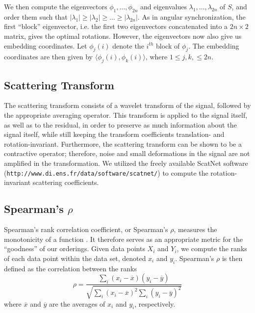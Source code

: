 \documentclass[10pt]{article}
\begin{document}
We then compute the eigenvectors $\phi_1, \dots, \phi_{2n}$ and eigenvalues $\lambda_1, \dots, \lambda_{2n}$ of $S$, and order them such that $|\lambda_1| \ge |\lambda_2| \ge \dots \ge |\lambda_{2n}|$.
%
As in angular synchronization, the first ``block'' eigenvector, i.e. the first two eigenvectors concatenated into a $2 n \times 2$ matrix, gives the optimal rotations. 
%
However, the eigenvectors now also give us embedding coordinates.
%
Let $\phi_j(i)$ denote the $i^{th}$ block of $\phi_j$. 
%
The embedding coordinates are then given by $\langle \phi_j(i), \phi_k(i) \rangle$, where $1 \le j, k, \le 2 n$. 

\subsection*{Scattering Transform}

The scattering transform consists of a wavelet transform of the signal, followed by  the appropriate averaging operator.
%
This transform is applied to the signal itself, as well as to the residual, in order to preserve as much information about the signal itself, while still keeping the transform coefficients translation- and rotation-invariant. 
% 
Furthermore, the scattering transform can be shown to be a contractive operator; therefore, noise and small deformations in the signal are not amplified in the transformation.
%
We utilized the freely available ScatNet software (\texttt{http://www.di.ens.fr/data/software/scatnet/}) to compute the rotation-invariant scattering coefficients. 

\subsection*{Spearman's $\rho$}

Spearman's rank correlation coefficient, or Spearman's $\rho$, measures the monotonicity of a function \cite{...}. 
%
It therefore serves as an appropriate metric for the ``goodness'' of our orderings.
%
Given data points $X_i$ and $Y_i$, we compute the ranks of each data point within the data set, denoted $x_i$ and $y_i$.
%
Spearman's $\rho$ is then defined as the correlation between the ranks
\begin{equation}
\rho = \frac{\sum_i (x_i - \overline{x})(y_i - \overline{y})}{\sqrt{\sum_i (x_i - \overline{x})^2 \sum_i (y_i - \overline{y})^2}}
\end{equation}
where $\overline{x}$ and $\overline{y}$ are the averages of $x_i$ and $y_i$, respectively. 
\end{document}
